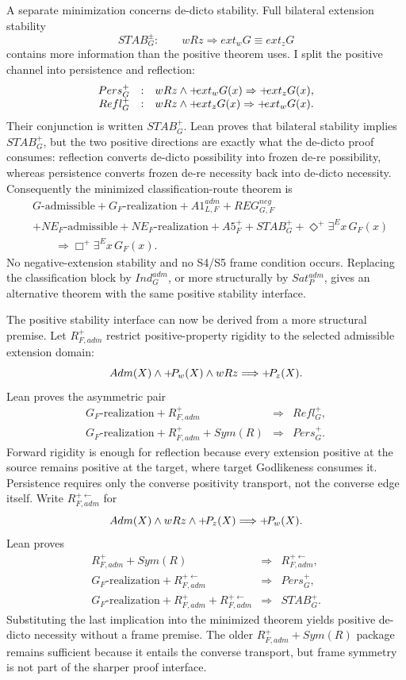 A separate minimization concerns de-dicto stability. Full bilateral extension stability
\[
  STAB_G^{\pm}:\qquad
  wRz\Rightarrow ext_wG\equiv ext_zG
\]
contains more information than the positive theorem uses. I split the positive channel into persistence and reflection:
\[
\begin{array}{rcl}
  Pers_G^+&:&wRz\land +\!ext_wG(x)\Rightarrow+\!ext_zG(x),\\
  Refl_G^+&:&wRz\land +\!ext_zG(x)\Rightarrow+\!ext_wG(x).
\end{array}
\]
Their conjunction is written \(STAB_G^+\). Lean proves that bilateral stability implies \(STAB_G^+\), but the two positive directions are exactly what the de-dicto proof consumes: reflection converts de-dicto possibility into frozen de-re possibility, whereas persistence converts frozen de-re necessity back into de-dicto necessity. Consequently the minimized classification-route theorem is
\[
\begin{split}
  &G\text{-admissible}
  +G_F\text{-realization}
  +A1_{L,F}^{adm}
  +REG_{G,F}^{neg}\\
  &+NE_F\text{-admissible}
  +NE_F\text{-realization}
  +A5_F^+
  +STAB_G^+
  +\Diamond^+\exists^E x\,G_F(x)\\
  &\qquad\Longrightarrow
  \Box^+\exists^E x\,G_F(x).
\end{split}
\]
No negative-extension stability and no S4/S5 frame condition occurs. Replacing the classification block by \(Ind_G^{adm}\), or more structurally by \(Sat_P^{adm}\), gives an alternative theorem with the same positive stability interface.

The positive stability interface can now be derived from a more structural premise. Let \(R_{F,adm}^+\) restrict positive-property rigidity to the selected admissible extension domain:
\[
  Adm(X)\land+\!P_w(X)\land wRz
  \Longrightarrow +\!P_z(X).
\]
Lean proves the asymmetric pair
\[
\begin{array}{rcl}
G_F\text{-realization}+R_{F,adm}^+&\Longrightarrow&Refl_G^+,\\
G_F\text{-realization}+R_{F,adm}^++Sym(R)&\Longrightarrow&Pers_G^+.
\end{array}
\]
Forward rigidity is enough for reflection because every extension positive at the source remains positive at the target, where target Godlikeness consumes it. Persistence requires only the converse positivity transport, not the converse edge itself. Write \(R_{F,adm}^{+\leftarrow}\) for
\[
  Adm(X)\land wRz\land+\!P_z(X)
  \Longrightarrow +\!P_w(X).
\]
Lean proves
\[
\begin{array}{rcl}
R_{F,adm}^++Sym(R)&\Longrightarrow&R_{F,adm}^{+\leftarrow},\\
G_F\text{-realization}+R_{F,adm}^{+\leftarrow}&\Longrightarrow&Pers_G^+,\\
G_F\text{-realization}+R_{F,adm}^++R_{F,adm}^{+\leftarrow}&\Longrightarrow&STAB_G^+.
\end{array}
\]
Substituting the last implication into the minimized theorem yields positive de-dicto necessity without a frame premise. The older \(R_{F,adm}^++Sym(R)\) package remains sufficient because it entails the converse transport, but frame symmetry is not part of the sharper proof interface.

